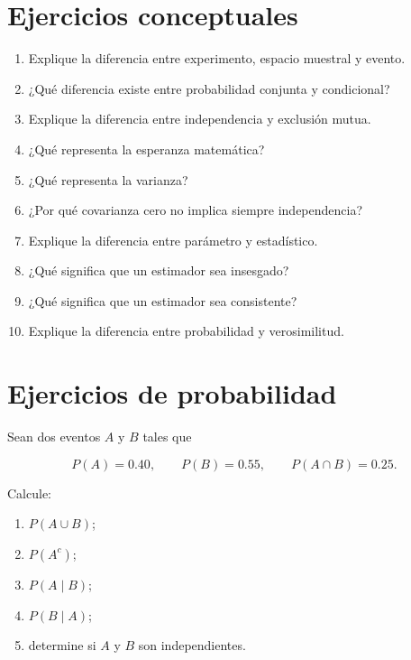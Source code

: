 \documentclass[
  spanish,
  10.5pt,
  letterpaper,
  DIV=11,
  numbers=noendperiod,
  oneside,
  open=any]{scrreprt}
\providecommand{\tightlist}{%
  \setlength{\itemsep}{0pt}\setlength{\parskip}{0pt}}
\theoremstyle{definition}
\theoremstyle{definition}
\theoremstyle{plain}
\theoremstyle{remark}
\begin{document}
\section*{Ejercicios conceptuales}\label{ejercicios-conceptuales-2}


\begin{enumerate}
\def\labelenumi{\arabic{enumi}.}
\tightlist
\item
  Explique la diferencia entre experimento, espacio muestral y evento.
\item
  ¿Qué diferencia existe entre probabilidad conjunta y condicional?
\item
  Explique la diferencia entre independencia y exclusión mutua.
\item
  ¿Qué representa la esperanza matemática?
\item
  ¿Qué representa la varianza?
\item
  ¿Por qué covarianza cero no implica siempre independencia?
\item
  Explique la diferencia entre parámetro y estadístico.
\item
  ¿Qué significa que un estimador sea insesgado?
\item
  ¿Qué significa que un estimador sea consistente?
\item
  Explique la diferencia entre probabilidad y verosimilitud.
\end{enumerate}

\section*{Ejercicios de probabilidad}\label{ejercicios-de-probabilidad}


Sean dos eventos \(A\) y \(B\) tales que

\[
P(A)=0.40,
\qquad
P(B)=0.55,
\qquad
P(A\cap B)=0.25.
\]

Calcule:

\begin{enumerate}
\def\labelenumi{\arabic{enumi}.}
\tightlist
\item
  \(P(A\cup B)\);
\item
  \(P(A^c)\);
\item
  \(P(A\mid B)\);
\item
  \(P(B\mid A)\);
\item
  determine si \(A\) y \(B\) son independientes.
\end{enumerate}
\end{document}
